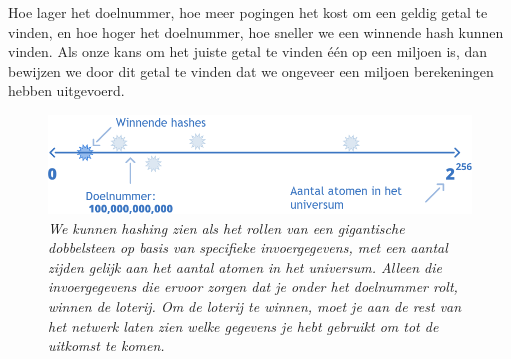 Hoe lager het doelnummer, hoe meer pogingen het kost om een geldig getal te vinden, en hoe hoger het doelnummer, hoe sneller we een winnende hash kunnen vinden. Als onze kans om het juiste getal te vinden één op een miljoen is, dan bewijzen we door dit getal te vinden dat we ongeveer een miljoen berekeningen hebben uitgevoerd.

\begin{figure}
    \centering
    \includegraphics[width=\textwidth]{images/fig5.png}
    \caption{\footnotesize{\textit{We kunnen hashing zien als het rollen van een gigantische dobbelsteen op basis van specifieke invoergegevens, met een aantal zijden gelijk aan het aantal atomen in het universum. Alleen die invoergegevens die ervoor zorgen dat je onder het doelnummer rolt, winnen de loterij. Om de loterij te winnen, moet je aan de rest van het netwerk laten zien welke gegevens je hebt gebruikt om tot de uitkomst te komen.}}}
    \label{fig5}
\end{figure}
